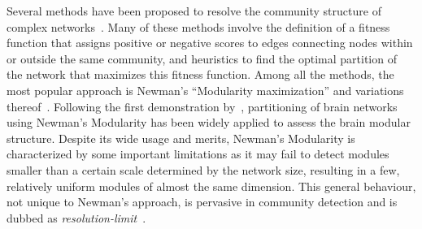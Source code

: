 
Several methods have been proposed to resolve the community structure of complex networks~\cite{fortunato2010,lancichinetti2009,fortunato2016}.
Many of these methods involve the definition of a fitness function that assigns positive or negative scores to edges connecting nodes within or outside the same community, and heuristics to find the optimal partition of the network that maximizes this fitness function.
Among all the methods, the most popular approach is Newman's ``Modularity maximization'' and variations thereof~\cite{newman2006}.
Following the first demonstration by~\cite{schwarz2008}, partitioning of brain networks using Newman's Modularity has been widely applied to assess the brain modular structure.
Despite its wide usage and merits, Newman's Modularity is characterized by some important limitations as it may fail to detect modules smaller than a certain scale determined by the network size, resulting in a few, relatively uniform modules of almost the same dimension.
This general behaviour, not unique to Newman's approach, is pervasive in community detection and is dubbed as \emph{resolution-limit}~\cite{fortunato2007}.

